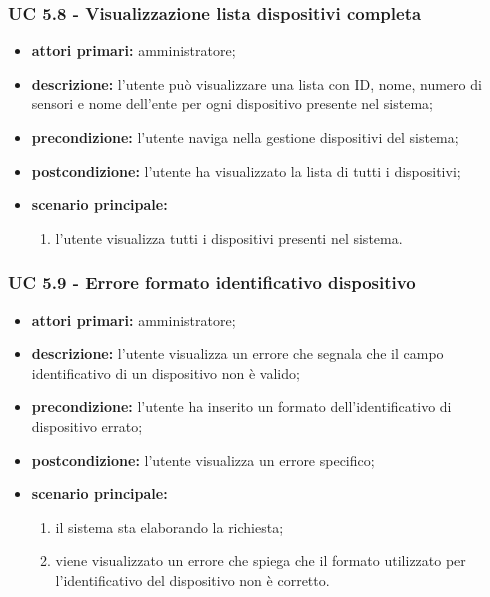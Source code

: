 			\subsubsection{UC 5.8 - Visualizzazione lista dispositivi completa}
			\begin{itemize}
				\item \textbf{attori primari:} amministratore;
				\item \textbf{descrizione:} l'utente può visualizzare una lista con ID, nome, numero di sensori e nome dell'ente per ogni dispositivo presente nel sistema;
				\item \textbf{precondizione:} l'utente naviga nella gestione dispositivi del sistema;
				\item \textbf{postcondizione:} l'utente ha visualizzato la lista di tutti i dispositivi;
				\item \textbf{scenario principale:}
				\begin{enumerate}
					\item{l'utente visualizza tutti i dispositivi presenti nel sistema.}
				\end{enumerate}
			\end{itemize}

			\subsubsection{UC 5.9 - Errore formato identificativo dispositivo}
			\begin{itemize}
				\item \textbf{attori primari:} amministratore;
				\item \textbf{descrizione:} l'utente visualizza un errore che segnala che il campo identificativo di un dispositivo non è valido;
				\item \textbf{precondizione:} l'utente ha inserito un formato dell'identificativo di dispositivo errato;
				\item \textbf{postcondizione:} l'utente visualizza un errore specifico;
				\item \textbf{scenario principale:}
				\begin{enumerate}
					\item il sistema sta elaborando la richiesta;
					\item viene visualizzato un errore che spiega che il formato utilizzato per l'identificativo del dispositivo non è corretto.
				\end{enumerate}
			\end{itemize}
